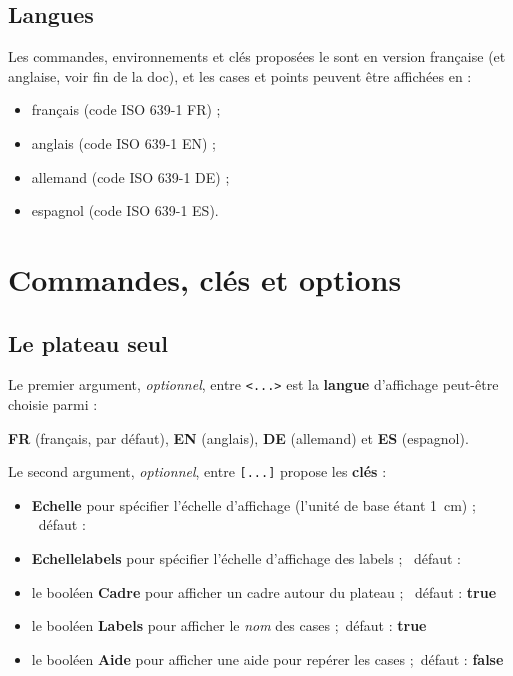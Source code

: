 \documentclass{article}
\newcommand\Cle[1]{{\bfseries\sffamily\textlangle #1\textrangle}}
\begin{document}
\subsection{Langues}

Les \textsf{commandes}, \textsf{environnements} et \textsf{clés} proposées le sont en version \textsf{française} (et \textsf{anglaise}, voir fin de la doc), et les cases et points peuvent être affichées en :

\begin{itemize}
	\item français (code ISO 639-1 FR) ;
	\item anglais (code ISO 639-1 EN) ;
	\item allemand (code ISO 639-1 DE) ;
	\item espagnol (code ISO 639-1 ES).
\end{itemize}

\pagebreak

\section{Commandes, clés et options}

\subsection{Le plateau seul}

Le premier argument, \textit{optionnel}, entre \texttt{<...>} est la \Cle{langue} d'affichage peut-être choisie parmi :

\hfill\Cle{FR} (français, par défaut), \Cle{EN} (anglais), \Cle{DE} (allemand) et \Cle{ES} (espagnol).\hfill~

\smallskip

Le second argument, \textit{optionnel}, entre \texttt{[...]} propose les \Cle{clés} :

\begin{itemize}
	\item \Cle{Echelle} pour spécifier l'échelle d'affichage (l'unité de base étant 1~cm) ; \hfill~défaut : \Cle{1}
	\item \Cle{Echellelabels} pour spécifier l'échelle d'affichage des labels ; \hfill~défaut : \Cle{1}
	\item le booléen \Cle{Cadre} pour afficher un cadre autour du plateau ; \hfill~défaut : \Cle{true}
	\item le booléen \Cle{Labels} pour afficher le \textit{nom} des cases ;\hfill~défaut : \Cle{true}
	\item le booléen \Cle{Aide} pour afficher une aide pour repérer les cases ;\hfill~défaut : \Cle{false}
\end{itemize}
\end{document}
